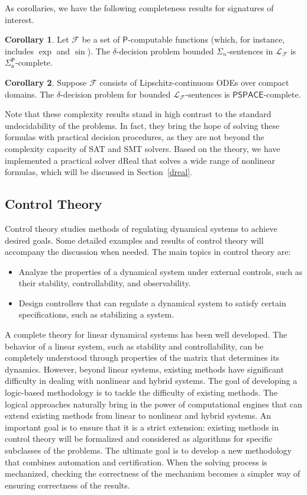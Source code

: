 \documentclass[11pt]{article}
\theoremstyle{definition}
\newtheorem{corollary}{Corollary}[section]
\begin{document}
As corollaries, we have the following completeness results for signatures of interest. 
\begin{corollary}
Let $\mathcal{F}$ be a set of $\mathsf{P}$-computable functions (which, for instance, includes $\exp$ and $\sin$). The $\delta$-decision problem bounded $\Sigma_n$-sentences in $\mathcal{L}_{\mathcal{F}}$ is $\mathsf{\Sigma_n^P}$-complete. 
\end{corollary}
\begin{corollary}
Suppose $\mathcal{F}$ consists of Lipschitz-continuous ODEs over compact domains. The $\delta$-decision problem for bounded $\mathcal{L}_{\mathcal{F}}$-sentences is $\mathsf{PSPACE}$-complete. 
\end{corollary}
Note that these complexity results stand in high contrast to the standard undecidability of the problems. In fact, they bring the hope of solving these formulas with practical decision procedures, as they are not beyond the complexity capacity of SAT and SMT solvers. Based on the theory, we have implemented a practical solver dReal that solves a wide range of nonlinear formulas, which will be discussed in Section~\ref{dreal}. 

\subsection{Control Theory} 

Control theory studies methods of regulating dynamical systems to achieve desired goals. Some detailed examples and results of control theory will accompany the discussion when needed. The main topics in control theory are: 
\begin{itemize}
\item Analyze the properties of a dynamical system under external controls, such as their stability, controllability, and observability. 
\item Design controllers that can regulate a dynamical system to satisfy certain specifications, such as stabilizing a system. 
\end{itemize}
A complete theory for linear dynamical systems has been well developed. The behavior of a linear system, such as stability and controllability, can be completely understood through properties of the matrix that determines its dynamics. However, beyond linear systems, existing methods have significant difficulty in dealing with nonlinear and hybrid systems. The goal of developing a logic-based methodology is to tackle the difficulty of existing methods. The logical approaches naturally bring in the power of computational engines that can extend existing methods from linear to nonlinear and hybrid systems. An important goal is to ensure that it is a strict extension: existing methods in control theory will be formalized and considered as algorithms for specific subclasses of the problems. The ultimate goal is to develop a new methodology that combines automation and certification. When the solving process is mechanized, checking the correctness of the mechanism becomes a simpler way of ensuring correctness of the results. 
\end{document}
